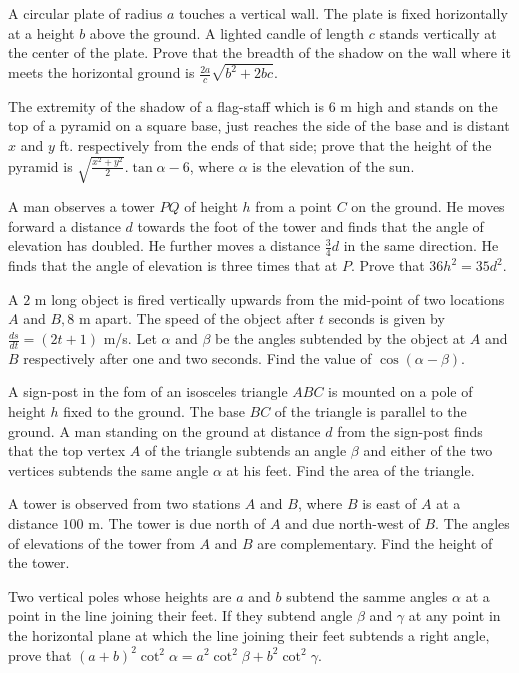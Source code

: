 \item A circular plate of radius $a$ touches a vertical wall. The plate is fixed horizontally at a height $b$ above the
  ground. A lighted candle of length $c$ stands vertically at the center of the plate. Prove that the breadth of the
  shadow on the wall where it meets the horizontal ground is $\frac{2a}{c}\sqrt{b^2 + 2bc}$.

\item The extremity of the shadow of a flag-staff which is $6$ m high and stands on the top of a pyramid on a square base,
  just reaches the side of the base and is distant $x$ and $y$ ft. respectively from the ends of that side; prove
  that the height of the pyramid is $\sqrt{\frac{x^2 + y^2}{2}}.\tan\alpha - 6$, where $\alpha$ is the elevation of
  the sun.

\item A man observes a tower $PQ$ of height $h$ from a point $C$ on the ground. He moves forward a distance
  $d$ towards the foot of the tower and finds that the angle of elevation has doubled. He further moves a distance
  $\frac{3}{4}d$ in the same direction. He finds that the angle of elevation is three times that at $P$. Prove that
  $36h^2 = 35d^2$.

\item A $2$ m long object is fired vertically upwards from the mid-point of two locations $A$ and $B, 8$ m
  apart. The speed of the object after $t$ seconds is given by $\frac{ds}{dt} = (2t + 1)$ m/s. Let $\alpha$
  and $\beta$ be the angles subtended by the object at $A$ and $B$ respectively after one and two
  seconds. Find the value of $\cos(\alpha - \beta)$.

\item A sign-post in the fom of an isosceles triangle $ABC$ is mounted on a pole of height $h$ fixed to the
  ground. The base $BC$ of the triangle is parallel to the ground. A man standing on the ground at distance $d$ from
  the sign-post finds that the top vertex $A$ of the triangle subtends an angle $\beta$ and either of the two
  vertices subtends the same angle $\alpha$ at his feet. Find the area of the triangle.

\item A tower is observed from two stations $A$ and $B$, where $B$ is east of $A$ at a distance
  $100$ m. The tower is due north of $A$ and due north-west of $B$. The angles of elevations of the tower from
  $A$ and $B$ are complementary. Find the height of the tower.

\item Two vertical poles whose heights are $a$ and $b$ subtend the samme angles $\alpha$ at a point in the line
  joining their feet. If they subtend angle $\beta$ and $\gamma$ at any point in the horizontal plane at which the
  line joining their feet subtends a right angle, prove that $(a + b)^2\cot^2\alpha = a^2\cot^2\beta + b^2\cot^2\gamma$.

